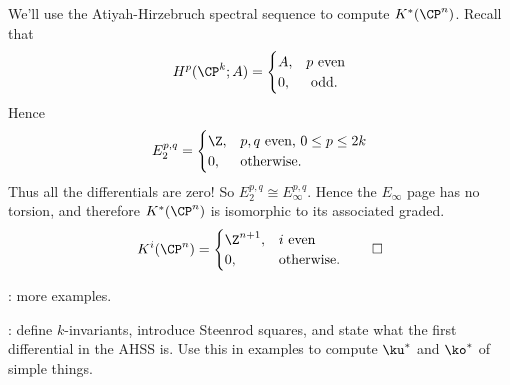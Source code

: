 
\begin{exm}
% 
We'll use the Atiyah-Hirzebruch spectral sequence to compute $K^*(\CP^n)$. Recall that
\[H^p(\CP^k;A) = \begin{cases}
	A, &p\text{ even}\\
	0, &\text{ odd.}
\end{cases}\]
Hence
\[E_2^{p,q} = \begin{cases}
	\Z, & p,q\text{ even, } 0\le p\le 2k\\
	0, &\text{otherwise.}
\end{cases}\]
Thus all the differentials are zero! So $E_2^{p,q} \cong E_\infty^{p,q}$. Hence the $E_\infty$ page has no torsion,
and therefore $K^*(\CP^n)$ is isomorphic to its associated graded. %
\[K^i(\CP^n) = \begin{cases}
	\Z^{n+1}, &i\text{ even}\\
	0, &\text{otherwise.}
\end{cases}\qedhere\]

\TODO: more examples.

\TODO: define $k$-invariants, introduce Steenrod squares, and state what the first differential in the AHSS is.
Use this in examples to compute $\ku^*$ and $\ko^*$ of simple things.

%
%



\end{exm}
